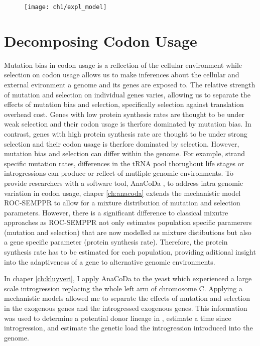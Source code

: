 \begin{figure}[H]
     \centering
	\texttt{[image: ch1/expl\_model]}
	\caption{}
	\label{fig:expl_model}
\end{figure}

\section{Decomposing Codon Usage}

Mutation bias in codon usage is a reflection of the cellular environment while selection on codon usage allows us to make inferences about the cellular and external evironment a genome and its genes are exposed to.
The relative strength of mutation and selection on individual genes varies, allowing us to separate the effects of mutation bias and selection, specifically selection against translation overhead cost.
Genes with low protein synthesis rates are thought to be under weak selection and their codon usage is therfore dominated by mutation bias.
In contrast, genes with high protein synthesis rate are thought to be under strong selection and their codon usage is therfore dominated by selection.
However, mutation bias and selection can differ within the genome.
For example, strand specific mutation rates, differences in the tRNA pool thorughout life stages or introgressions can produce or reflect of mutliple genomic environments.
To provide researchers with a software tool, AnaCoDa \cite{landerer2018}, to address intra genomic variation in codon usage, chaper \ref{ch:anacoda} extends the mechanistic model ROC-SEMPPR \cite{gilchrist2015} to allow for a mixture distribution of mutation and selection parameters.
However, there is a significant difference to classical mixutre approaches as ROC-SEMPPR not only estimates population specific paramerers (mutation and selection) that are now modelled as mixture distibutions but also a gene specific parameter (protein synthesis rate). 
Therefore, the protein synthesis rate has to be estimated for each population, providing aditional insight into the adaptiveness of a gene to alternative genomic environments.

In chaper \ref{ch:kluyveri}, I apply AnaCoDa to the yeast \kluyveri which experienced a large scale introgression replacing the whole left arm of chromosome C.
Applying a mechanistic models allowed me to separate the effects of mutation and selection in the exogenous \kluyveri genes and the introgressed exogenous genes.
This information was used to determine a potential donor lineage in \gossypii, estimate a time since introgression, and estimate the genetic load the introgression introduced into the  \kluyveri genome.

